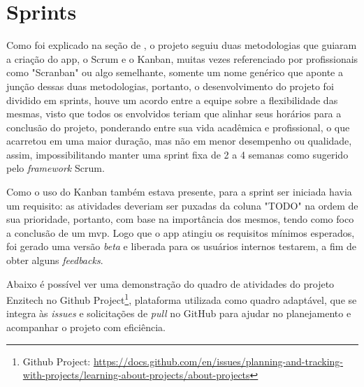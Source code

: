 


\section{Sprints}\label{sec:sprint}
Como foi explicado na seção de , o projeto seguiu duas metodologias que guiaram a criação do \ac{app}, o Scrum e o Kanban, muitas vezes referenciado por profissionais como "Scranban" ou algo semelhante, somente um nome genérico que aponte a junção dessas duas metodologias, portanto, o desenvolvimento do projeto foi dividido em sprints, houve um acordo entre a equipe sobre a flexibilidade das mesmas, visto que todos os envolvidos teriam que alinhar seus horários para a conclusão do projeto, ponderando entre sua vida acadêmica e profissional, o que acarretou em uma maior duração, mas não em menor desempenho ou qualidade, assim, impossibilitando manter uma sprint fixa de 2 a 4 semanas como sugerido pelo \textit{framework} Scrum. 

Como o uso do Kanban também estava presente, para a sprint ser iniciada havia um requisito: as atividades deveriam ser puxadas da coluna "TODO" na ordem de sua prioridade, portanto, com base na importância dos mesmos, tendo como foco a conclusão de um \ac{mvp}. Logo que o \ac{app} atingiu os requisitos mínimos esperados, foi gerado uma versão \textit{beta} e liberada para os usuários internos testarem, a fim de obter alguns \textit{feedbacks}.

Abaixo é possível ver uma demonstração do quadro de atividades do projeto Enzitech no Github Project\footnote{\label{githubproject}Github Project: \url{https://docs.github.com/en/issues/planning-and-tracking-with-projects/learning-about-projects/about-projects}}, plataforma utilizada como quadro adaptável, que se integra às \textit{issues} e solicitações de \textit{pull} no GitHub para ajudar no planejamento e acompanhar o projeto com eficiência.


